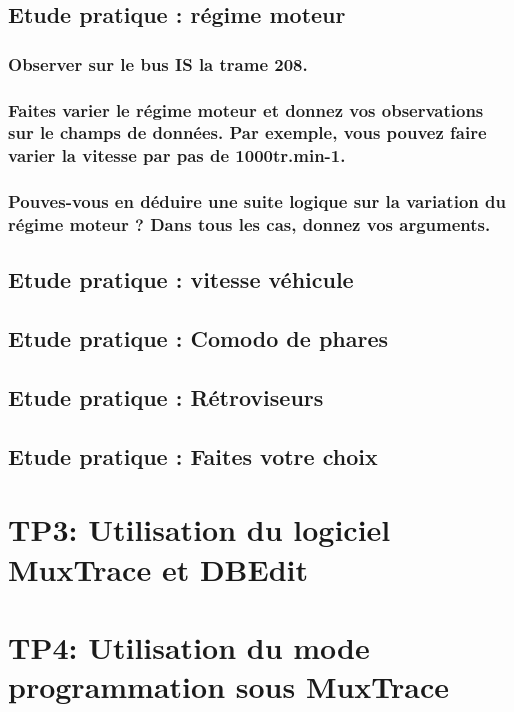 \documentclass{rapportECC}
\begin{document}
\subsection{Etude pratique : régime moteur}


\subsubsection*{Observer sur le bus IS la trame 208.}
\subsubsection*{Faites varier le régime moteur et donnez vos observations sur le champs de données. Par exemple, vous pouvez faire varier la vitesse par pas de 1000tr.min\uppercase{-1}.}
\subsubsection*{Pouves-vous en déduire une suite logique sur la variation du régime moteur ? Dans tous les cas, donnez vos arguments.}


\subsection{Etude pratique : vitesse véhicule}


\subsection{Etude pratique : Comodo de phares}

\subsection{Etude pratique : Rétroviseurs}

\subsection{Etude pratique : Faites votre choix}

\section{TP3: Utilisation du logiciel MuxTrace et DBEdit}

\section{TP4: Utilisation du mode programmation sous MuxTrace}
\end{document}
